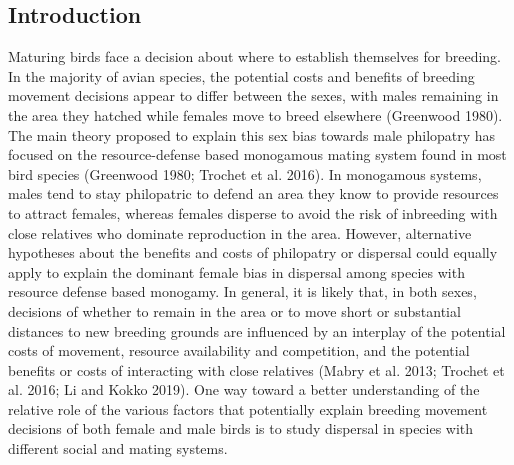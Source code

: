 \documentclass[
]{article}
\begin{document}
\newpage

\hypertarget{introduction}{%
\subsection{Introduction}\label{introduction}}

Maturing birds face a decision about where to establish themselves for
breeding. In the majority of avian species, the potential costs and
benefits of breeding movement decisions appear to differ between the
sexes, with males remaining in the area they hatched while females move
to breed elsewhere (Greenwood 1980). The main theory proposed to explain
this sex bias towards male philopatry has focused on the
resource-defense based monogamous mating system found in most bird
species (Greenwood 1980; Trochet et al. 2016). In monogamous systems,
males tend to stay philopatric to defend an area they know to provide
resources to attract females, whereas females disperse to avoid the risk
of inbreeding with close relatives who dominate reproduction in the
area. However, alternative hypotheses about the benefits and costs of
philopatry or dispersal could equally apply to explain the dominant
female bias in dispersal among species with resource defense based
monogamy. In general, it is likely that, in both sexes, decisions of
whether to remain in the area or to move short or substantial distances
to new breeding grounds are influenced by an interplay of the potential
costs of movement, resource availability and competition, and the
potential benefits or costs of interacting with close relatives (Mabry
et al. 2013; Trochet et al. 2016; Li and Kokko 2019). One way toward a
better understanding of the relative role of the various factors that
potentially explain breeding movement decisions of both female and male
birds is to study dispersal in species with different social and mating
systems.
\end{document}
